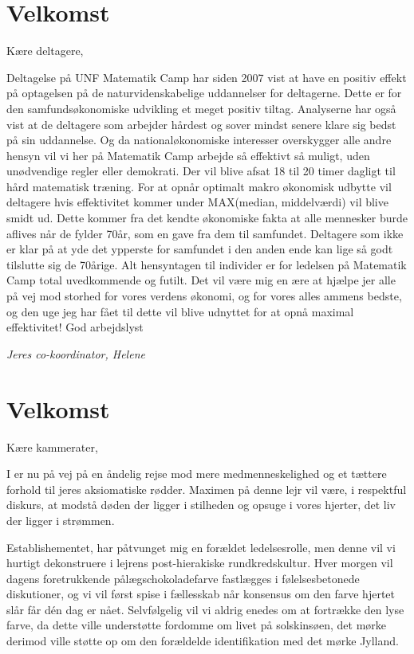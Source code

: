 

\begin{minipage}[b]{0.95\linewidth}
\begin{minipage}[t]{0.47\textwidth}
\vspace{3mm}

\section*{Velkomst}
Kære deltagere,

Deltagelse på UNF Matematik Camp har siden 2007 vist at have en positiv effekt på optagelsen på de naturvidenskabelige uddannelser for deltagerne. Dette er for den samfundsøkonomiske udvikling et meget positiv tiltag. Analyserne har også vist at de deltagere som arbejder hårdest og sover mindst senere klare sig bedst på sin uddannelse. Og da nationaløkonomiske interesser overskygger alle andre hensyn vil vi her på Matematik Camp arbejde så effektivt så muligt, uden unødvendige regler eller demokrati. Der vil blive afsat 18 til 20 timer dagligt til hård matematisk træning. For at opnår optimalt makro økonomisk udbytte vil deltagere hvis effektivitet kommer under MAX(median, middelværdi) vil blive smidt ud. Dette kommer fra det kendte økonomiske fakta at alle mennesker burde aflives når de fylder 70år, som en gave fra dem til samfundet. Deltagere som ikke er klar på at yde det ypperste for samfundet i den anden ende kan lige så godt tilslutte sig de 70årige. Alt hensyntagen til individer er for ledelsen på Matematik Camp total uvedkommende og futilt. 
Det vil være mig en ære at hjælpe jer alle på vej mod storhed for vores verdens økonomi, og for vores alles ammens bedste, og den uge jeg har fået til dette vil blive udnyttet for at opnå maximal effektivitet!
God arbejdslyst 

{\flushright\emph{Jeres co-koordinator, Helene}}

\section*{Velkomst}
Kære kammerater,

I er nu på vej på en åndelig rejse mod mere medmenneskelighed og et tættere forhold til jeres aksiomatiske rødder. Maximen på denne lejr vil være, i respektful diskurs, at modstå døden der ligger i stilheden og opsuge i vores hjerter, det liv der ligger i strømmen. 

Establishementet, har påtvunget mig en forældet ledelsesrolle, men denne vil vi hurtigt dekonstruere i lejrens post-hierakiske rundkredskultur. Hver morgen vil dagens foretrukkende pålægschokoladefarve fastlægges i følelsesbetonede diskutioner, og vi vil først spise i fællesskab når konsensus om den farve hjertet slår får dén dag er nået. Selvfølgelig vil vi aldrig enedes om at fortrække den lyse farve, da dette ville understøtte fordomme om livet på solskinsøen, det mørke derimod ville støtte op om den forældelde identifikation med det mørke Jylland. 


\end{minipage}
\end{minipage}
